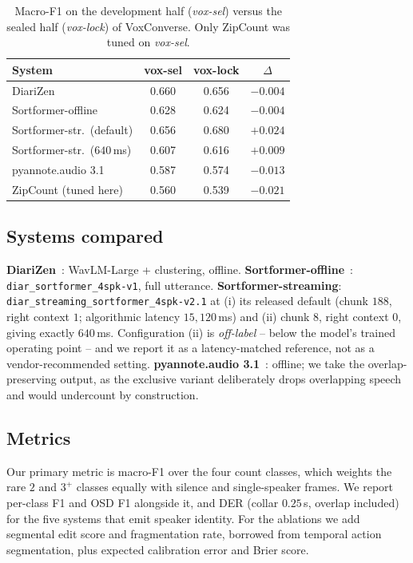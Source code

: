 \documentclass[journal]{IEEEtran}
\newcommand{\sys}{ZipCount}
\begin{document}
\begin{table}[t]
\centering
\caption{Macro-F1 on the development half (\emph{vox-sel}) versus the sealed
half (\emph{vox-lock}) of VoxConverse. Only \sys{} was tuned on
\emph{vox-sel}.}
\label{tab:leak}
\small
\begin{tabular}{lccc}
\toprule
System & vox-sel & vox-lock & $\Delta$ \\
\midrule
DiariZen                     & 0.660 & 0.656 & $-0.004$ \\
Sortformer-offline           & 0.628 & 0.624 & $-0.004$ \\
Sortformer-str.\ (default)   & 0.656 & 0.680 & $+0.024$ \\
Sortformer-str.\ ($640$\,ms) & 0.607 & 0.616 & $+0.009$ \\
pyannote.audio 3.1           & 0.587 & 0.574 & $-0.013$ \\
\midrule
\sys{} (tuned here)          & 0.560 & 0.539 & $\mathbf{-0.021}$ \\
\bottomrule
\end{tabular}
\end{table}

\subsection{Systems compared}
\textbf{DiariZen}~\cite{han2024diarizen}: WavLM-Large + clustering, offline.
\textbf{Sortformer-offline}~\cite{park2024sortformer}:
\texttt{diar\_sortformer\_4spk-v1}, full utterance.
\textbf{Sortformer-streaming}: \texttt{diar\_streaming\_sortformer\_4spk-v2.1}
at (i) its released default (chunk $188$, right context $1$; algorithmic
latency $15{,}120$\,ms) and (ii) chunk $8$, right context $0$, giving
exactly $640$\,ms. Configuration (ii) is \emph{off-label} -- below the
model's trained operating point -- and we report it as a latency-matched
reference, not as a vendor-recommended setting.
\textbf{pyannote.audio 3.1}~\cite{bredin2023pyannote}: offline; we take the
overlap-preserving output, as the exclusive variant deliberately drops
overlapping speech and would undercount by construction.

\subsection{Metrics}
Our primary metric is macro-F1 over the four count classes, which weights
the rare $2$ and $3^{+}$ classes equally with silence and single-speaker
frames. We report per-class F1 and OSD F1 alongside it, and DER (collar
$0.25$\,s, overlap included) for the five systems that emit speaker
identity. For the ablations we add segmental edit score and fragmentation
rate, borrowed from temporal action segmentation, plus expected calibration
error and Brier score.
\end{document}

